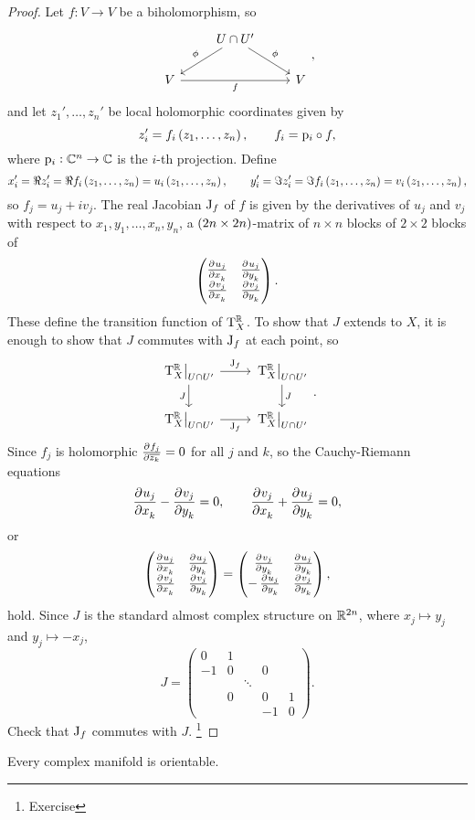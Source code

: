 \begin{proof}
Let $ f : V \to V $ be a biholomorphism, so
$$
\begin{tikzcd}
& U \cap U' \arrow[swap]{dl}{\phi} \arrow{dr}{\phi} & \\
V \arrow[swap]{rr}{f} & & V
\end{tikzcd},
$$
and let $ z_1', \dots, z_n' $ be local holomorphic coordinates given by
$$ z_i' = f_i\br{z_1, \dots, z_n}, \qquad f_i = \p_i \circ f, $$
where $ \mathrm{p}_i : \mathbb{C}^n \to \mathbb{C} $ is the $ i $-th projection. Define
$$ x_i' = \Re z_i' = \Re f_i\br{z_1, \dots, z_n} = u_i\br{z_1, \dots, z_n}, \qquad y_i' = \Im z_i' = \Im f_i\br{z_1, \dots, z_n} = v_i\br{z_1, \dots, z_n}, $$
so $ f_j = u_j + iv_j $. The real Jacobian $ \mathrm{J}_f $ of $ f $ is given by the derivatives of $ u_j $ and $ v_j $ with respect to $ x_1, y_1, \dots, x_n, y_n $, a $ \br{2n \times 2n} $-matrix of $ n \times n $ blocks of $ 2 \times 2 $ blocks of
$$ \twobytwo{\tpd{u_j}{x_k}}{\tpd{u_j}{y_k}}{\tpd{v_j}{x_k}}{\tpd{v_j}{y_k}}. $$
These define the transition function of $ \mathrm{T}_X^{\mathbb{R}} $. To show that $ J $ extends to $ X $, it is enough to show that $ J $ commutes with $ \mathrm{J}_f $ at each point, so
$$
\begin{tikzcd}
\eval{\T_X^\RR}_{U \cap U'} \arrow{r}{\J_f} \arrow[swap]{d}{J} & \eval{\T_X^\RR}_{U \cap U'} \arrow{d}{J} \\
\eval{\T_X^\RR}_{U \cap U'} \arrow[swap]{r}{\J_f} & \eval{\T_X^\RR}_{U \cap U'}
\end{tikzcd}.
$$
Since $ f_j $ is holomorphic $ \tpd{f_j}{\overline{z_k}} = 0 $ for all $ j $ and $ k $, so the Cauchy-Riemann equations
$$ \dpd{u_j}{x_k} - \dpd{v_j}{y_k} = 0, \qquad \dpd{v_j}{x_k} + \dpd{u_j}{y_k} = 0, $$
or
$$ \twobytwo{\tpd{u_j}{x_k}}{\tpd{u_j}{y_k}}{\tpd{v_j}{x_k}}{\tpd{v_j}{y_k}} = \twobytwo{\tpd{v_j}{y_k}}{\tpd{u_j}{y_k}}{-\tpd{u_j}{y_k}}{\tpd{v_j}{y_k}}, $$
hold. Since $ J $ is the standard almost complex structure on $ \mathbb{R}^{2n} $, where $ x_j \mapsto y_j $ and $ y_j \mapsto -x_j $,
$$ J =
\begin{pmatrix}
0 & 1 & & & \\
-1 & 0 & & 0 & \\
& & \ddots & & \\
& 0 & & 0 & 1 \\
& & & -1 & 0
\end{pmatrix}.
$$
Check that $ \mathrm{J}_f $ commutes with $ J $. \footnote{Exercise}
\end{proof}

\begin{corollary}
Every complex manifold is orientable.
\end{corollary}

